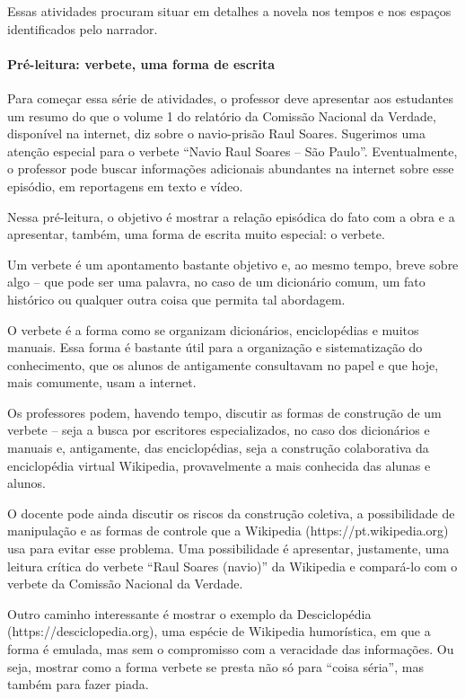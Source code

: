 \documentclass[12pt]{extarticle}
\begin{document}
Essas atividades procuram situar em detalhes a novela nos tempos e nos
espaços identificados pelo narrador.

\paragraph{Pré-leitura: verbete, uma forma de escrita}

Para começar essa série de atividades, o professor deve apresentar aos
estudantes um resumo do que o volume 1 do relatório da Comissão Nacional
da Verdade, disponível na internet, diz sobre o navio-prisão Raul
Soares. Sugerimos uma atenção especial para o verbete ``Navio Raul
Soares -- São Paulo''. Eventualmente, o professor pode buscar informações
adicionais abundantes na internet sobre esse episódio, em reportagens em
texto e vídeo.

Nessa pré-leitura, o objetivo é mostrar a relação episódica do fato com
a obra e a apresentar, também, uma forma de escrita muito especial: o
verbete.

Um verbete é um apontamento bastante objetivo e, ao mesmo tempo, breve
sobre algo -- que pode ser uma palavra, no caso de um dicionário comum,
um fato histórico ou qualquer outra coisa que permita tal abordagem.

O verbete é a forma como se organizam dicionários, enciclopédias e
muitos manuais. Essa forma é bastante útil para a organização e
sistematização do conhecimento, que os alunos de antigamente consultavam
no papel e que hoje, mais comumente, usam a internet.

Os professores podem, havendo tempo, discutir as formas de construção de
um verbete -- seja a busca por escritores especializados, no caso dos
dicionários e manuais e, antigamente, das enciclopédias, seja a
construção colaborativa da enciclopédia virtual Wikipedia, provavelmente
a mais conhecida das alunas e alunos.

O docente pode ainda discutir os riscos da construção coletiva, a
possibilidade de manipulação e as formas de controle que a Wikipedia
(https://pt.wikipedia.org) usa para evitar esse problema. Uma
possibilidade é apresentar, justamente, uma leitura crítica do verbete
``Raul Soares (navio)'' da Wikipedia e compará-lo com o verbete da
Comissão Nacional da Verdade.

Outro caminho interessante é mostrar o exemplo da Desciclopédia
(https://desciclopedia.org), uma espécie de Wikipedia humorística, em
que a forma é emulada, mas sem o compromisso com a veracidade das
informações. Ou seja, mostrar como a forma verbete se presta não só para
``coisa séria'', mas também para fazer piada.
\end{document}
